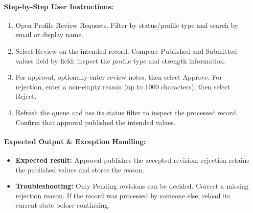 \paragraph{Step-by-Step User Instructions:}
\begin{enumerate}[leftmargin=1.8em,itemsep=3pt]
  \item {} Open Profile Review Requests. Filter by status/profile type and search by email or display name.
  \item {} Select Review on the intended record. Compare Published and Submitted values field by field; inspect the profile type and strength information.
  \item {} For approval, optionally enter review notes, then select Approve. For rejection, enter a non-empty reason (up to 1000 characters), then select Reject.
  \item {} Refresh the queue and use its status filter to inspect the processed record. Confirm that approval published the intended values.
\end{enumerate}
\paragraph{Expected Output \& Exception Handling:}
\begin{itemize}[leftmargin=1.5em,itemsep=2pt]
  \item \textbf{Expected result:} Approval publishes the accepted revision; rejection retains the published values and stores the reason.
  \item \textbf{Troubleshooting:} Only Pending revisions can be decided. Correct a missing rejection reason. If the record was processed by someone else, reload its current state before continuing.
\end{itemize}
